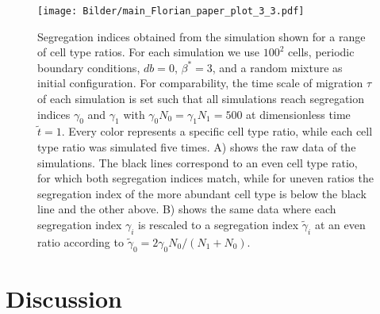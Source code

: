 \documentclass[10pt,letterpaper]{article}
\begin{document}
\begin{figure}[ht!]
 \centering
 \texttt{[image: Bilder/main\_Florian\_paper\_plot\_3\_3.pdf]}
 \caption{Segregation indices obtained from the simulation shown for
   a range of cell type ratios. For each simulation we use $100^2$
   cells, periodic boundary conditions, $db=0$, $\beta^*=3$, and a
   random mixture as initial configuration. For comparability, the
   time scale of migration $\tau$ of each simulation is set such that all
   simulations reach segregation indices $\gamma_0$ and $\gamma_1$
   with $\gamma_0N_0 = \gamma_1N_1 = 500$ at dimensionless time
   $\tilde{t}=1$. Every color represents a specific cell type ratio,
   while each cell type ratio was simulated five times. A) shows the
   raw data of the simulations. The black lines correspond to an even
   cell type ratio, for which both segregation indices match, while
   for uneven ratios the segregation index of the more abundant cell
   type is below the black line and the other above. B) shows the same
   data where each segregation index $\gamma_i$ is rescaled to a
   segregation index $\tilde{\gamma}_i$ at an even ratio according to
   $\tilde{\gamma}_0 = 2 \gamma_0 N_0/(N_1+N_0)$.}
 \label{fig:main_Florian_paper_plot_3_3}
\end{figure}

\section*{Discussion}
\end{document}
